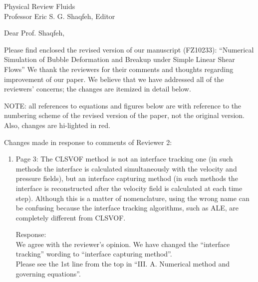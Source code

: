 \documentclass{letter}
\date{\today}
\begin{document}
\begin{letter}{
Physical Review Fluids\\
Professor Eric S. G. Shaqfeh, Editor\\}

\opening{Dear Prof. Shaqfeh,}

Please find enclosed the revised version of our manuscript (FZ10233):
``Numerical Simulation of Bubble Deformation and Breakup under Simple Linear Shear Flows''
We thank the reviewers for their comments and thoughts regarding improvement 
of our paper. We believe that we have addressed all of the reviewers’ 
concerns; the changes are itemized in detail below.


\par\noindent
NOTE: all references to equations and figures below are with
reference to the numbering scheme of the revised version of the paper,
not the original version.  Also, changes are hi-lighted in red.
\par\noindent

Changes made in response to comments of Reviewer 2: 
\begin{enumerate}
\item
\textsf
{Page 3: The CLSVOF method is not an interface tracking one (in such methods
the interface is calculated simultaneously with the velocity and pressure
fields), but an interface capturing method (in such methods the interface is
reconstructed after the velocity field is calculated at each time step).
Although this is a matter of nomenclature, using the wrong name can be
confusing because the interface tracking algorithms, such as ALE, are
completely different from CLSVOF.}
\vspace{3 mm}

Response: \\
We agree with the reviewer's opinion. We have changed the ``interface tracking''
wording to ``interface capturing method''.
\\
Please see the 1st line from the top in ``I\hspace{-1.2pt}I\hspace{-1.2pt}I. A. Numerical method and governing equations''.
\\


\end{enumerate}
\end{letter}
\end{document}

